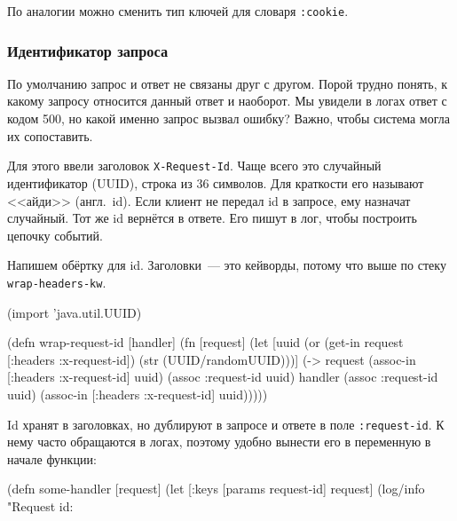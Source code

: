По аналогии можно сменить тип ключей для словаря \verb|:cookie|.

\subsubsection*{Идентификатор запроса}


По умолчанию запрос и ответ не связаны друг с другом. Порой трудно понять, к
какому запросу относится данный ответ и наоборот. Мы увидели в логах ответ с
кодом 500, но какой именно запрос вызвал ошибку? Важно, чтобы система могла их
сопоставить.

Для этого ввели заголовок \verb|X-Request-Id|. Чаще всего это случайный
идентификатор (UUID), строка из 36 символов. Для краткости его называют <<айди>>
(англ.~id). Если клиент не передал id в запросе, ему назначат случайный. Тот же
id вернётся в ответе. Его пишут в лог, чтобы построить цепочку событий.


Напишем обёртку для id. Заголовки~--- это кейворды, потому что выше по стеку
\verb|wrap-headers-kw|.

\begin{english}
  \begin{clojure}
(import 'java.util.UUID)

(defn wrap-request-id [handler]
  (fn [request]
    (let [uuid (or (get-in request [:headers :x-request-id])
                   (str (UUID/randomUUID)))]
      (-> request
          (assoc-in [:headers :x-request-id] uuid)
          (assoc :request-id uuid)
          handler
          (assoc :request-id uuid)
          (assoc-in [:headers :x-request-id] uuid)))))
  \end{clojure}
\end{english}


Id хранят в заголовках, но дублируют в запросе и ответе в поле
\verb|:request-id|. К нему часто обращаются в логах, поэтому удобно вынести
его в переменную в начале функции:


\begin{english}
  \begin{clojure}
(defn some-handler [request]
  (let [{:keys [params request-id]} request]
    (log/info "Request id: %
  \end{clojure}
\end{english}

